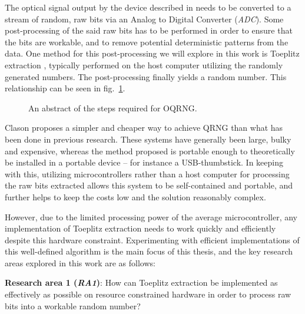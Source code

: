 The optical signal output by the device described in \cite{Clason2023} needs to be converted to a stream of random, raw bits via an Analog to Digital Converter (\emph{ADC}). Some post-processing of the said raw bits has to be performed in order to ensure that the bits are workable, and to remove potential deterministic patterns from the data. One method for this post-processing we will explore in this work is Toeplitz extraction \cite{toeplitz}, typically performed on the host computer utilizing the randomly generated numbers. The post-processing finally yields a random number. This relationship can be seen in fig.~\ref{fig:linear-system}.

\begin{figure}[ht] \centering {} \caption{An abstract of the steps required for OQRNG.}
\label{fig:linear-system} \end{figure}

Clason proposes a simpler and cheaper way to achieve QRNG \cite{Clason2023} than what has been done in previous research. These systems have generally been large, bulky and expensive, whereas the method proposed is portable enough to theoretically be installed in a portable device -- for instance a USB-thumbstick. In keeping with this, utilizing microcontrollers rather than a host computer for processing the raw bits extracted allows this system to be self-contained and portable, and further helps to keep the costs low and the solution reasonably complex.

However, due to the limited processing power of the average microcontroller, any implementation of Toeplitz extraction needs to work quickly and efficiently despite this hardware constraint. Experimenting with efficient implementations of this well-defined algorithm is the main focus of this thesis, and the key research areas explored in this work are as follows:

\textbf{Research area 1 (\emph{RA1})}: How can Toeplitz extraction be implemented as effectively as possible on resource constrained hardware in order to process raw bits into a workable random number?


